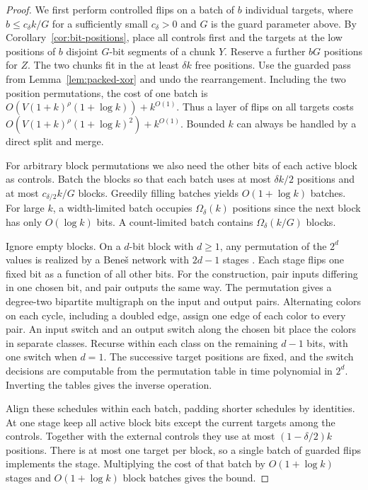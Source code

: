\begin{proof}
We first perform controlled flips on a batch of $b$ individual targets,
where $b\le c_\delta k/G$ for a sufficiently small $c_\delta>0$ and
$G$ is the guard parameter above. By Corollary~\ref{cor:bit-positions},
place all controls first and the targets at the low positions of $b$
disjoint $G$-bit segments of a chunk $Y$. Reserve a further $bG$
positions for $Z$. The two chunks fit in the at least $\delta k$ free
positions. Use the guarded pass from Lemma~\ref{lem:packed-xor} and
undo the rearrangement. Including the two position permutations, the
cost of one batch is $O(V(1+k)^\rho(1+\log k))+k^{O(1)}$. Thus a
layer of flips on all targets costs
$O(V(1+k)^\rho(1+\log k)^2)+k^{O(1)}$. Bounded $k$ can always be
handled by a direct split and merge.

For arbitrary block permutations we also need the other bits of each
active block as controls. Batch the blocks so that each batch uses at most
$\delta k/2$ positions and at most $c_{\delta/2}k/G$ blocks.
Greedily filling batches yields $O(1+\log k)$ batches. For large $k$,
a width-limited batch occupies $\Omega_\delta(k)$ positions since the
next block has only $O(\log k)$ bits. A count-limited batch contains
$\Omega_\delta(k/G)$ blocks.

Ignore empty blocks. On a $d$-bit block with $d\ge1$, any permutation of the $2^d$ values is realized by
a Bene\v{s} network with $2d-1$ stages \cite{benes}. Each stage flips
one fixed bit as a function of all other bits. For the construction,
pair inputs differing in one chosen bit, and pair outputs the same way.
The permutation gives a degree-two bipartite multigraph on the input
and output pairs. Alternating colors on each cycle, including a doubled
edge, assign one edge of each color to every pair. An input switch and
an output switch along the chosen bit place the colors in separate
classes. Recurse within each class on the remaining $d-1$ bits, with
one switch when $d=1$. The successive target positions are fixed, and
the switch decisions are computable from the permutation table in time
polynomial in $2^d$. Inverting the tables gives the inverse operation.

Align these schedules within each batch, padding shorter schedules by
identities. At one stage keep all active block bits except the current
targets among the controls. Together with the external controls they
use at most $(1-\delta/2)k$ positions. There is at most one target per
block, so a single batch of guarded flips implements the stage.
Multiplying the cost of that batch by $O(1+\log k)$ stages and
$O(1+\log k)$ block batches gives the bound.
\end{proof}
